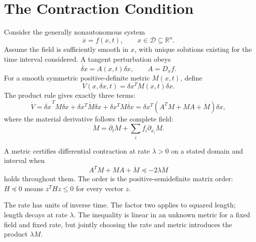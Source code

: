 \section{The Contraction Condition}
\label{laymans:metric_tensor_reminder}

Consider the generally nonautonomous system
\begin{equation}
\dot x=f(x,t),\qquad x\in\mathcal D\subseteq\mathbb R^n.
\label{eq:ch4:system}
\end{equation}
Assume the field is sufficiently smooth in $x$, with unique solutions existing for the time interval considered. A tangent perturbation obeys
\begin{equation}
\dot{\delta x}=A(x,t)\delta x,\qquad A=D_xf.
\label{eq:ch4:variational}
\end{equation}
For a smooth symmetric positive-definite metric $M(x,t)$, define
\begin{equation}
V(x,\delta x,t)=\delta x^T M(x,t)\delta x.
\label{eq:ch4:lyapunov-perturbation}
\end{equation}
The product rule gives exactly three terms:
\begin{equation}
\dot V=\dot{\delta x}^{\,T}M\delta x+\delta x^T\dot M\delta x+
\delta x^TM\dot{\delta x}
=\delta x^T(A^TM+MA+\dot M)\delta x,
\label{eq:ch4:Vdot}
\end{equation}
where the material derivative follows the complete field:
\begin{equation}
\dot M=\partial_tM+\sum_i f_i\partial_{x_i}M.
\label{eq:ch4:Mdot}
\end{equation}

\begin{definition}
\label{def:ch4:contraction}
A metric certifies differential contraction at rate $\lambda>0$ on a stated domain and interval when
\begin{equation}
A^TM+MA+\dot M\preceq-2\lambda M
\label{eq:ch4:contraction-LMI}
\end{equation}
holds throughout them. The order is the positive-semidefinite matrix order: $H\preceq0$ means $z^THz\leq0$ for every vector $z$.
\end{definition}

The rate has units of inverse time. The factor two applies to squared length; length decays at rate $\lambda$. The inequality is linear in an unknown metric for a fixed field and fixed rate, but jointly choosing the rate and metric introduces the product $\lambda M$.

